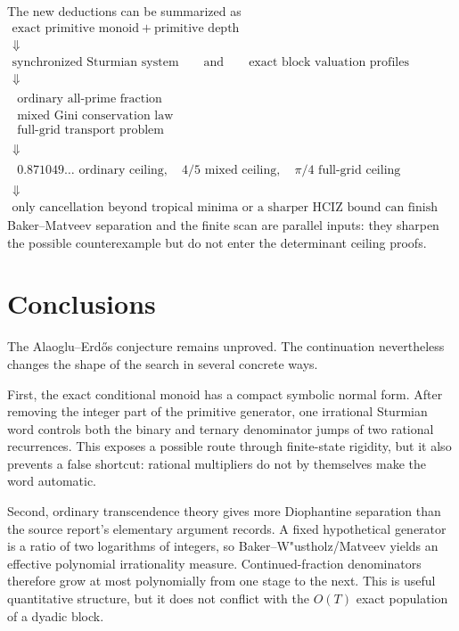 \documentclass[11pt,oneside]{article}
\theoremstyle{definition}
\theoremstyle{remark}
\begin{document}
The new deductions can be summarized as
\[
\begin{array}{c}
\text{exact primitive monoid}\ +\ \text{primitive depth}
\\[2pt]\Downarrow\\[-2pt]
\text{synchronized Sturmian system}
\qquad\text{and}\qquad
\text{exact block valuation profiles}
\\[2pt]\Downarrow\\[-2pt]
\begin{array}{c}
\text{ordinary all-prime fraction}\\[2pt]
\text{mixed Gini conservation law}\\[2pt]
\text{full-grid transport problem}
\end{array}
\\[2pt]\Downarrow\\[-2pt]
\begin{array}{c}
0.871049\ldots\text{ ordinary ceiling},\quad
4/5\text{ mixed ceiling},\quad
\pi/4\text{ full-grid ceiling}
\end{array}
\\[2pt]\Downarrow\\[-2pt]
\text{only cancellation beyond tropical minima or a sharper HCIZ bound can finish these routes.}
\end{array}
\]
Baker--Matveev separation and the finite scan are parallel inputs: they sharpen the possible
counterexample but do not enter the determinant ceiling proofs.

\section{Conclusions}
\label{ct:conclusion}

The Alaoglu--Erd\H{o}s conjecture remains unproved.  The continuation nevertheless changes the
shape of the search in several concrete ways.

First, the exact conditional monoid has a compact symbolic normal form.  After removing the
integer part of the primitive generator, one irrational Sturmian word controls both the
binary and ternary denominator jumps of two rational recurrences.  This exposes a possible
route through finite-state rigidity, but it also prevents a false shortcut: rational
multipliers do not by themselves make the word automatic.

Second, ordinary transcendence theory gives more Diophantine separation than the source
report's elementary argument records.  A fixed hypothetical generator is a ratio of two
logarithms of integers, so Baker--W"ustholz/Matveev yields an effective polynomial
irrationality measure.  Continued-fraction denominators therefore grow at most polynomially
from one stage to the next.  This is useful quantitative structure, but it does not conflict
with the $O(T)$ exact population of a dyadic block.
\end{document}
